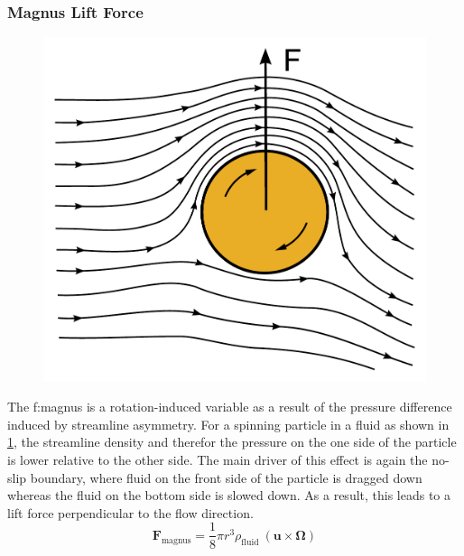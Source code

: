 \subsubsection{Magnus Lift Force}
\vspace{\baselineskip}
\begin{figure}[h!]
	\centering
	\includegraphics[width=0.6\linewidth]{./Ressources/Fluidic/Magnus-effect.pdf}
	\label{fig:fluidic:magnus}
\end{figure}
The \gls{f:magnus} is a rotation-induced variable as a result of the pressure difference induced by streamline asymmetry.\cite{lit:fluidic:inertialFluidicsForces} For a spinning particle in a fluid as shown in \cref{fig:fluidic:magnus}, the streamline density and therefor the pressure on the one side of the particle is lower relative to the other side. The main driver of this effect is again the no-slip boundary, where fluid on the front side of the particle is dragged down whereas the fluid on the bottom side is slowed down. As a result, this leads to a lift force perpendicular to the flow direction.
\begin{equation}	
	\mathbf{F}_\text{magnus} =  \frac{1}{8}\pi r^3 \rho_\text{fluid} \ ( \mathbf{u} \times \mathbf{\Omega}) \label{eq:f:magnus}
\end{equation}

